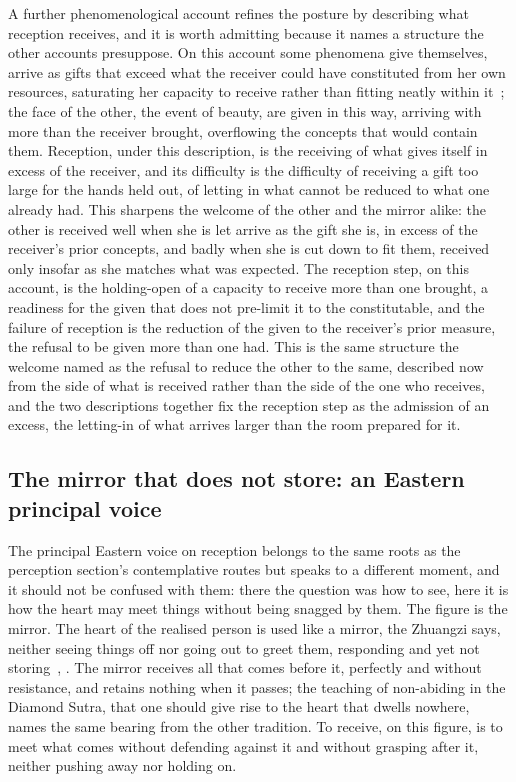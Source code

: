 A further phenomenological account refines the posture by describing what reception receives, and it is worth admitting because it names a structure the other accounts presuppose. On this account some phenomena give themselves, arrive as gifts that exceed what the receiver could have constituted from her own resources, saturating her capacity to receive rather than fitting neatly within it~\parencite{marion_givenness}; the face of the other, the event of beauty, are given in this way, arriving with more than the receiver brought, overflowing the concepts that would contain them. Reception, under this description, is the receiving of what gives itself in excess of the receiver, and its difficulty is the difficulty of receiving a gift too large for the hands held out, of letting in what cannot be reduced to what one already had. This sharpens the welcome of the other and the mirror alike: the other is received well when she is let arrive as the gift she is, in excess of the receiver's prior concepts, and badly when she is cut down to fit them, received only insofar as she matches what was expected. The reception step, on this account, is the holding-open of a capacity to receive more than one brought, a readiness for the given that does not pre-limit it to the constitutable, and the failure of reception is the reduction of the given to the receiver's prior measure, the refusal to be given more than one had. This is the same structure the welcome named as the refusal to reduce the other to the same, described now from the side of what is received rather than the side of the one who receives, and the two descriptions together fix the reception step as the admission of an excess, the letting-in of what arrives larger than the room prepared for it.

\subsection{The mirror that does not store: an Eastern principal voice}
\label{p22:sub:reception-mirror}

The principal Eastern voice on reception belongs to the same roots as the perception section's contemplative routes but speaks to a different moment, and it should not be confused with them: there the question was how to see, here it is how the heart may meet things without being snagged by them. The figure is the mirror. The heart of the realised person is used like a mirror, the Zhuangzi says, neither seeing things off nor going out to greet them, responding and yet not storing~\parencite{zhuangzi}, . The mirror receives all that comes before it, perfectly and without resistance, and retains nothing when it passes; the teaching of non-abiding in the Diamond Sutra, that one should give rise to the heart that dwells nowhere, names the same bearing from the other tradition. To receive, on this figure, is to meet what comes without defending against it and without grasping after it, neither pushing away nor holding on.

